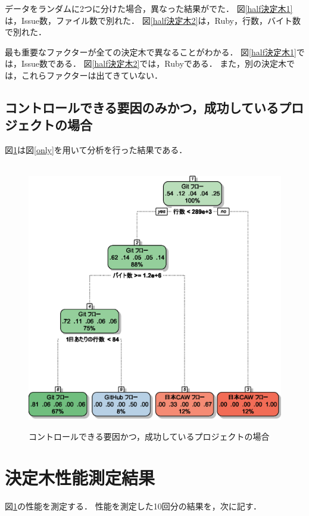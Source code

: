 データをランダムに2つに分けた場合，異なった結果がでた．
図\ref{half決定木1}は，Issue数，ファイル数で別れた．
図\ref{half決定木2}は，Ruby，行数，バイト数で別れた．

最も重要なファクターが全ての決定木で異なることがわかる．
図\ref{half決定木1}では，Issue数である．
図\ref{half決定木2}では，Rubyである．
また，別の決定木では，これらファクターは出てきていない．




\subsection{コントロールできる要因のみかつ，成功しているプロジェクトの場合}

図\ref{onlyDecision}は図\ref{only}を用いて分析を行った結果である．

\begin{figure}[H]
\centering　
\includegraphics[width=13cm]{onlyDecitionTree.eps}
\caption{コントロールできる要因かつ，成功しているプロジェクトの場合}\label{onlyDecision}
\end{figure}



\section{決定木性能測定結果}
図\ref{onlyDecision}の性能を測定する．
性能を測定した10回分の結果を，次に記す．


